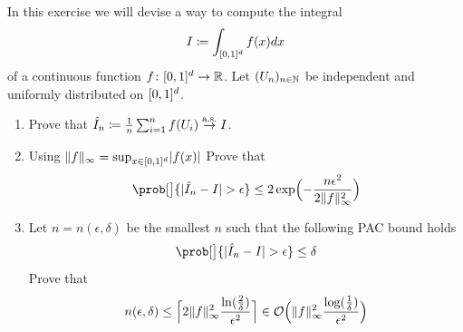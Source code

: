 \documentclass[11pt]{article}
\begin{document}
\begin{exercise}[subtitle={Monte Carlo}]
    \label{ex: monte carlo}
    In this exercise we will devise a way to compute the integral
    \[
        I \coloneq \int_{[0,1]^\dims} f(x) dx
    \]
    of a continuous function \(f\colon [0,1]^\dims \to \real\).  Let
    \((U_n)_{n\in \nat}\) be independent and uniformly distributed on
    \([0,1]^\dims\).
    \begin{enumerate}[label=(\alph*), noitemsep]
        \item\label{it: (monte carlo) convergence}
        Prove that \(\hat I_n \coloneq \frac1n\sum_{i=1}^n f(U_i) \overset\as\to I\).

        \item\label{it: (monte carlo) PAC bound}
        Using \(\norm{f}_\infty = \sup_{x\in [0,1]^\dims} \abs{f(x)}\) Prove that
        \[
            \prob[\big]{\abs{\hat I_n - I} > \epsilon} \le 2\exp\Bigl(-\frac{n \epsilon^2}{2\norm{f}_\infty^2}\Bigr)
        \]

        \item\label{it: (monte carlo) sample complexity}
        Let \(n = n(\epsilon, \delta)\) be the smallest \(n\) such that the following
        PAC bound holds
        \[
            \prob[\big]{\abs{\hat I_n - I} > \epsilon} \le \delta
        \]
        Prove that
        \[
            n(\epsilon, \delta)
            \le \ceil[\Big]{2\norm{f}_\infty^2\frac{\ln(\tfrac2\delta)}{\epsilon^2}}
            \in \bigO\Bigl(\norm{f}_\infty^2\frac{\log(\frac1\delta)}{\epsilon^2}\Bigr)
        \]
    \end{enumerate}
\end{exercise}
\end{document}
